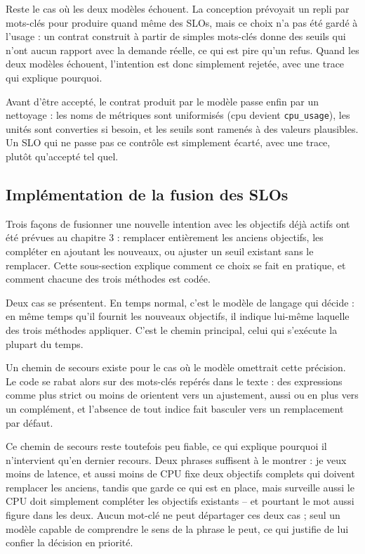 Reste le cas où les deux modèles échouent. La conception prévoyait un repli par mots-clés pour produire quand même des SLOs, mais ce choix n'a pas été gardé à l'usage : un contrat construit à partir de simples mots-clés donne des seuils qui n'ont aucun rapport avec la demande réelle, ce qui est pire qu'un refus. Quand les deux modèles échouent, l'intention est donc simplement rejetée, avec une trace qui explique pourquoi.

Avant d'être accepté, le contrat produit par le modèle passe enfin par un nettoyage : les noms de métriques sont uniformisés (\og cpu \fg devient \texttt{cpu\_usage}), les unités sont converties si besoin, et les seuils sont ramenés à des valeurs plausibles. Un SLO qui ne passe pas ce contrôle est simplement écarté, avec une trace, plutôt qu'accepté tel quel.

\subsection{Implémentation de la fusion des SLOs}

Trois façons de fusionner une nouvelle intention avec les objectifs déjà actifs ont été prévues au chapitre 3 : remplacer entièrement les anciens objectifs, les compléter en ajoutant les nouveaux, ou ajuster un seuil existant sans le remplacer. Cette sous-section explique comment ce choix se fait en pratique, et comment chacune des trois méthodes est codée.

Deux cas se présentent. En temps normal, c'est le modèle de langage qui décide : en même temps qu'il fournit les nouveaux objectifs, il indique lui-même laquelle des trois méthodes appliquer. C'est le chemin principal, celui qui s'exécute la plupart du temps.

Un chemin de secours existe pour le cas où le modèle omettrait cette précision. Le code se rabat alors sur des mots-clés repérés dans le texte : des expressions comme \og plus strict \fg ou \og moins de \fg orientent vers un ajustement, \og aussi \fg ou \og en plus \fg vers un complément, et l'absence de tout indice fait basculer vers un remplacement par défaut.

Ce chemin de secours reste toutefois peu fiable, ce qui explique pourquoi il n'intervient qu'en dernier recours. Deux phrases suffisent à le montrer : \og je veux moins de latence, et aussi moins de CPU \fg fixe deux objectifs complets qui doivent remplacer les anciens, tandis que \og garde ce qui est en place, mais surveille aussi le CPU \fg doit simplement compléter les objectifs existants -- et pourtant le mot \og aussi \fg figure dans les deux. Aucun mot-clé ne peut départager ces deux cas ; seul un modèle capable de comprendre le sens de la phrase le peut, ce qui justifie de lui confier la décision en priorité.

